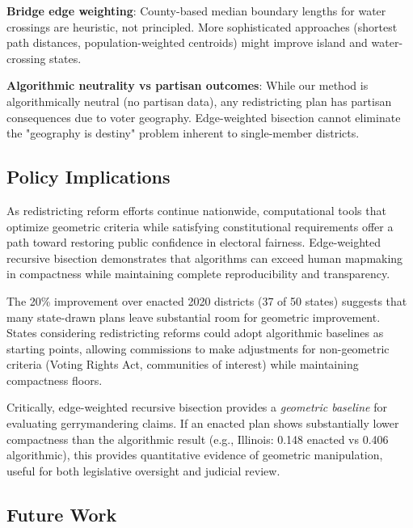 \textbf{Bridge edge weighting}: County-based median boundary lengths for water crossings are heuristic, not principled. More sophisticated approaches (shortest path distances, population-weighted centroids) might improve island and water-crossing states.

\textbf{Algorithmic neutrality vs partisan outcomes}: While our method is algorithmically neutral (no partisan data), any redistricting plan has partisan consequences due to voter geography. Edge-weighted bisection cannot eliminate the "geography is destiny" problem inherent to single-member districts.

\subsection{Policy Implications}

As redistricting reform efforts continue nationwide, computational tools that optimize geometric criteria while satisfying constitutional requirements offer a path toward restoring public confidence in electoral fairness. Edge-weighted recursive bisection demonstrates that algorithms can exceed human mapmaking in compactness while maintaining complete reproducibility and transparency.

The 20\% improvement over enacted 2020 districts (37 of 50 states) suggests that many state-drawn plans leave substantial room for geometric improvement. States considering redistricting reforms could adopt algorithmic baselines as starting points, allowing commissions to make adjustments for non-geometric criteria (Voting Rights Act, communities of interest) while maintaining compactness floors.

Critically, edge-weighted recursive bisection provides a \textit{geometric baseline} for evaluating gerrymandering claims. If an enacted plan shows substantially lower compactness than the algorithmic result (e.g., Illinois: 0.148 enacted vs 0.406 algorithmic), this provides quantitative evidence of geometric manipulation, useful for both legislative oversight and judicial review.

\subsection{Future Work}

